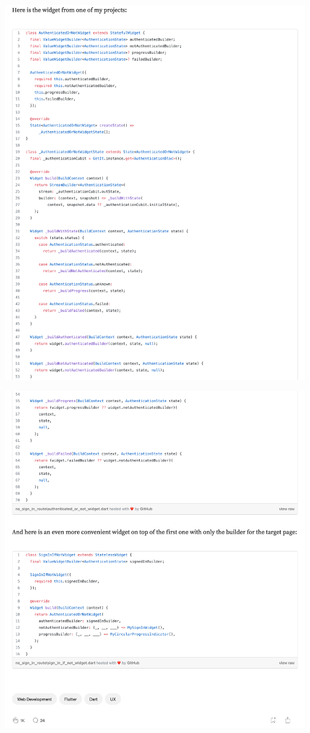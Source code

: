 \Continuing
\begin{center}
    \includegraphics[width=35em]{sign-in-routes-p4}
\end{center}
\WillContinue
\pagebreak

\Continuing
\begin{center}
    \includegraphics[width=35em]{sign-in-routes-p5}
\end{center}

\pagebreak
